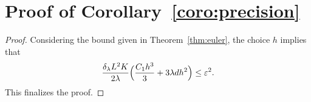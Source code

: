
\section{Proof of Corollary~\ref{coro:precision}}
\begin{proof}
Considering the bound given in Theorem~\ref{thm:euler}, the choice $h$ implies that
\begin{align}
\frac{\delta_\lambda L^2 K}{2\lambda} \Bigl( \frac{C_1 h^3}{3} + 3 \lambda d h^2 \Bigr) \leq \varepsilon^2. \label{eqn:cor_Th}
\end{align}
This finalizes the proof. 
\end{proof}



